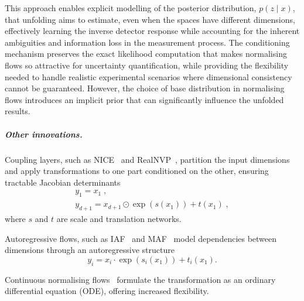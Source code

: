                 This approach enables explicit modelling of the posterior distribution,
                \(p(z\mid x)\), that unfolding aims to estimate, even when the spaces have different dimensions, effectively learning the inverse detector response while accounting for the inherent ambiguities and information loss in the measurement process.
                The conditioning mechanism preserves the exact likelihood computation that makes normalising flows so attractive for uncertainty quantification, while providing the flexibility needed to handle realistic experimental scenarios where dimensional consistency cannot be guaranteed.
                However, the choice of base distribution in normalising flows introduces an implicit prior that can significantly influence the unfolded results.
            \subparagraph{Other innovations.}
                Coupling layers, such as NICE~\cite{dinh_nice_2015} and RealNVP~\cite{dinh_density_2017}, partition the input dimensions and apply transformations to one part conditioned on the other, ensuring tractable Jacobian determinants
                \begin{gather}
                    y_{1} = x_{1}\;,\\
                    y_{d+1} = x_{d+1} \odot \exp(s(x_{1})) + t(x_{1})\;,
                \end{gather}
                where \(s\) and \(t\) are scale and translation networks.
    
                Autoregressive flows, such as IAF~\cite{kingma_improving_2017} and MAF~\cite{papamakarios_masked_2018} model dependencies between dimensions through an autoregressive structure
                \begin{equation}
                    y_i = x_i \cdot \exp(s_i(x_{1})) + t_i(x_{1}).
                \end{equation}
                
                Continuous normalising flows~\cite{mathieu_riemannian_2020} formulate the transformation as an ordinary differential equation (ODE), offering increased flexibility.
